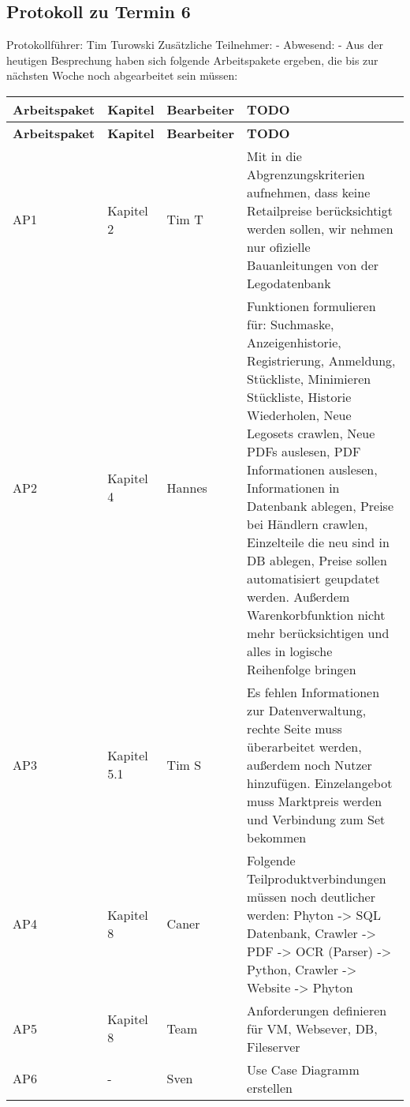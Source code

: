 \subsection{Protokoll zu Termin 6}
Protokollführer: Tim Turowski \newline
Zusätzliche Teilnehmer: - \newline
Abwesend: - \newline \newline
Aus der heutigen Besprechung haben sich folgende Arbeitspakete ergeben, die bis zur nächsten Woche noch abgearbeitet sein müssen:
\begin{flushleft}
	\begin{longtable}{p{3cm}p{2cm}p{2cm}p{10cm}}
		\toprule
		\textbf{Arbeitspaket} & \textbf{Kapitel} & \textbf{Bearbeiter} & \textbf{TODO}\\
		\midrule\endfirsthead
		\toprule
		\textbf{Arbeitspaket} & \textbf{Kapitel} & \textbf{Bearbeiter} & \textbf{TODO}\\
\midrule\endfirsthead
		AP1 & Kapitel 2 &  Tim T & Mit in die Abgrenzungskriterien aufnehmen, dass keine Retailpreise berücksichtigt werden sollen, wir nehmen nur ofizielle Bauanleitungen von der Legodatenbank \\ \midrule
		AP2& Kapitel 4 &  Hannes & Funktionen formulieren für: Suchmaske, Anzeigenhistorie, Registrierung, Anmeldung, Stückliste, Minimieren Stückliste, Historie Wiederholen, Neue Legosets crawlen, Neue PDFs auslesen, PDF Informationen auslesen, Informationen in Datenbank ablegen, Preise bei Händlern crawlen, Einzelteile die neu sind in DB ablegen, Preise sollen automatisiert geupdatet werden. Außerdem Warenkorbfunktion nicht mehr berücksichtigen und alles in logische Reihenfolge bringen\\ \midrule
		AP3 & Kapitel 5.1 &  Tim S & Es fehlen Informationen zur Datenverwaltung, rechte Seite muss überarbeitet werden, außerdem noch Nutzer hinzufügen. Einzelangebot muss Marktpreis werden und Verbindung zum Set bekommen \\ \midrule
		AP4 & Kapitel 8 & Caner & Folgende Teilproduktverbindungen müssen noch deutlicher werden: Phyton -> SQL Datenbank, Crawler -> PDF -> OCR (Parser) -> Python, Crawler -> Website -> Phyton  \\ \midrule
		AP5 & Kapitel 8 &  Team &  Anforderungen definieren für VM, Websever, DB, Fileserver \\ \midrule
		AP6 & - &  Sven &  Use Case Diagramm erstellen \\ \midrule

\end{longtable}
\end{flushleft}
